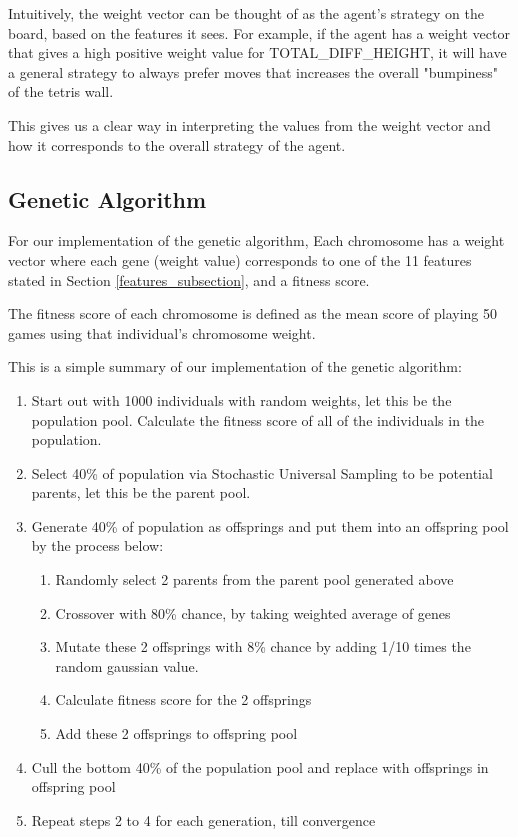 \documentclass[a4paper,12pt,twocolumn]{article}
\begin{document}
Intuitively, the weight vector can be thought of as the agent's strategy on
the board, based on the features it sees. For example, if the agent has a weight
vector that gives a high positive weight value for TOTAL\_DIFF\_HEIGHT, it will have
a general strategy to always prefer moves that increases the overall "bumpiness" of
the tetris wall.

This gives us a clear way in interpreting the values from the weight vector and how
it corresponds to the overall strategy of the agent.

\subsection{Genetic Algorithm}
\label{genetic}
For our implementation of the genetic algorithm, Each chromosome has a weight
vector where each gene (weight value) corresponds to one of the 11 features
stated in Section \ref{features_subsection}, and a fitness score.


The fitness score of each chromosome is defined as the mean score of playing 50
games using that individual's chromosome weight.

This is a simple summary of our implementation of the genetic algorithm:
\begin{enumerate}
    \item Start out with 1000 individuals with random weights, let this be the population pool.
    Calculate the fitness score of all of the individuals in the population.
    \item Select 40\% of population via Stochastic Universal Sampling to be
            potential parents, let this be the parent pool.
    \item Generate 40\% of population as offsprings and put them into an offspring pool
    by the process below:
        \begin{enumerate}
            \item Randomly select 2 parents from the parent pool generated above
            \item Crossover with 80\% chance, by taking weighted average of genes
            \item Mutate these 2 offsprings with 8\% chance by adding 1/10 times
                the random gaussian value.
            \item Calculate fitness score for the 2 offsprings
            \item Add these 2 offsprings to offspring pool
        \end{enumerate}
    \item Cull the bottom 40\% of the population pool and replace with offsprings
    in offspring pool
    \item Repeat steps 2 to 4 for each generation, till convergence
\end{enumerate}
\end{document}
